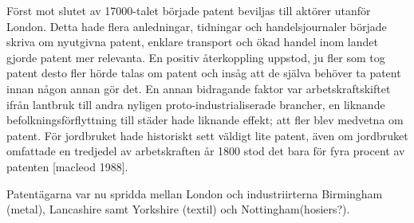 Först mot slutet av 17000-talet började patent beviljas till aktörer utanför London. Detta hade flera anledningar, tidningar och handelsjournaler började skriva om nyutgivna patent, enklare transport och ökad handel inom landet gjorde patent mer relevanta. En positiv återkoppling uppstod, ju fler som tog patent desto fler hörde talas om patent och insåg att de själva behöver ta patent innan någon annan gör det. En annan bidragande faktor var arbetskraftskiftet ifrån lantbruk till andra nyligen proto-industrialiserade brancher, en liknande befolkningsförflyttning till städer hade liknande effekt; att fler blev medvetna om patent. För jordbruket hade historiskt sett väldigt lite patent, även om jordbruket omfattade en tredjedel av arbetskraften år 1800 stod det bara för fyra procent av patenten [macleod 1988].

Patentägarna var nu spridda mellan London och industriirterna Birmingham (metal), Lancashire samt Yorkshire (textil) och Nottingham(hosiers?). 




